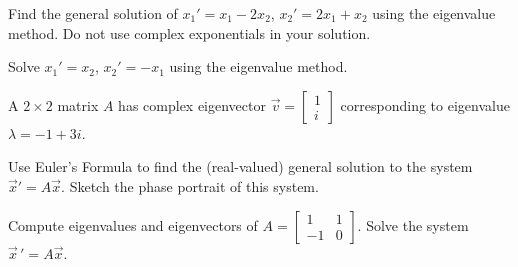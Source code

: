 \begin{exercise}
Find the general solution of $x_1' = x_1 -2 x_2$,
$x_2' = 2 x_1 + x_2$ using the eigenvalue method.
Do not use complex exponentials in your solution.
\end{exercise}

\begin{exercise}\ansMark%
Solve $x_1' = x_2$, $x_2' = -x_1$ using the eigenvalue method.
\end{exercise}

\begin{exercise}
A $2\times 2$ matrix $A$ has complex eigenvector $\displaystyle \vec{v}=\begin{bmatrix} 1\\ i \end{bmatrix}$ corresponding to eigenvalue $\lambda=-1+3i$. %
\begin{tasks}
\task Use Euler's Formula to find the (real-valued) general solution to the system $\vec{x}'=A\vec{x}$.
\task Sketch the phase portrait of this system.
\end{tasks}
\end{exercise}

\begin{exercise}\ansMark%
\leavevmode
\begin{tasks}
\task
Compute eigenvalues and eigenvectors of
$A=\left[ \begin{smallmatrix}
1 & 1 \\
-1 & 0 
\end{smallmatrix}\right]$.
\task
Solve the system $\vec{x}\,' = A\vec{x}$.
\end{tasks}
\end{exercise}

